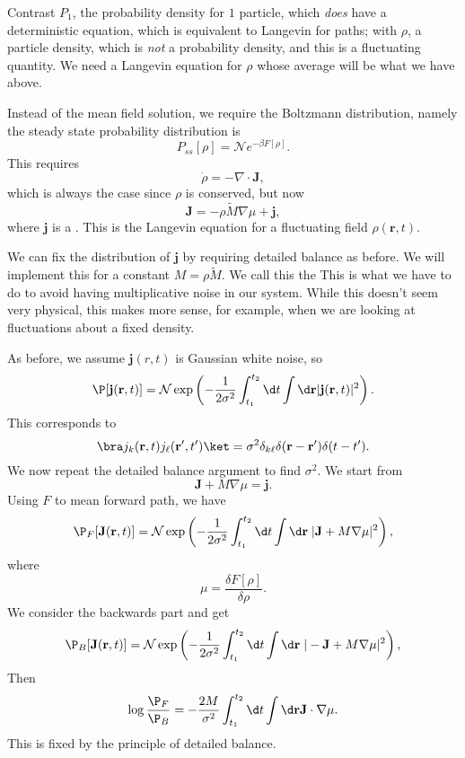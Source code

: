 \documentclass[a4paper]{article}
\begin{document}
Contrast $P_1$, the probability density for $1$ particle, which \emph{does} have a deterministic equation, which is equivalent to Langevin for paths; with $\rho$, a particle density, which is \emph{not} a probability density, and this is a fluctuating quantity. We need a Langevin equation for $\rho$ whose average will be what we have above.

Instead of the mean field solution, we require the Boltzmann distribution, namely the steady state probability distribution is
\[
  P_{ss}[\rho] = \mathcal{N} e^{-\beta F[\rho]}.
\]
This requires
\[
  \dot{\rho} = - \nabla \cdot \mathbf{J},
\]
which is always the case since $\rho$ is conserved, but now
\[
  \mathbf{J} = - \rho \tilde{M} \nabla \mu + \mathbf{j},
\]
where $\mathbf{j}$ is a . This is the Langevin equation for a fluctuating field $\rho(\mathbf{r}, t)$.

We can fix the distribution of $\mathbf{j}$ by requiring detailed balance as before. We will implement this for a constant $M = \rho \tilde{M}$. We call this the  This is what we have to do to avoid having multiplicative noise in our system. While this doesn't seem very physical, this makes more sense, for example, when we are looking at fluctuations about a fixed density.

As before, we assume $\mathbf{j}(r, t)$ is Gaussian white noise, so
\[
  \P[\mathbf{j}(\mathbf{r}, t)] = \mathcal{N} \exp \left(-\frac{1}{2\sigma^2} \int_{t_1}^{t_2} \d t\int \d \mathbf{r} |\mathbf{j}(\mathbf{r}, t)|^2\right).
\]
This corresponds to
\[
  \bra j_k (\mathbf{r}, t)j_\ell(\mathbf{r}', t')\ket = \sigma^2 \delta_{k\ell} \delta(\mathbf{r} - \mathbf{r}') \delta(t - t').
\]
We now repeat the detailed balance argument to find $\sigma^2$. We start from
\[
  \mathbf{J} + M \nabla \mu = \mathbf{j}.
\]
Using $F$ to mean forward path, we have
\[
  \P_F[\mathbf{J}(\mathbf{r}, t)] = \mathcal{N} \exp \left(-\frac{1}{2\sigma^2} \int_{t_1}^{t_2} \d t \int \d \mathbf{r} \; |\mathbf{J} + M \nabla \mu|^2 \right),
\]
where
\[
  \mu = \frac{\delta F[\rho]}{\delta \rho}.
\]
We consider the backwards part and get
\[
  \P_B[\mathbf{J}(\mathbf{r}, t)] = \mathcal{N} \exp \left(-\frac{1}{2\sigma^2} \int_{t_1}^{t_2} \d t \int \d \mathbf{r} \; |-\mathbf{J} + M \nabla \mu|^2 \right),
\]
Then
\[
  \log \frac{\P_F}{\P_B} = - \frac{2M}{\sigma^2} \int_{t_1}^{t_2} \d t \int \d \mathbf{r} \mathbf{J} \cdot \nabla \mu.
\]
This is fixed by the principle of detailed balance.
\end{document}
